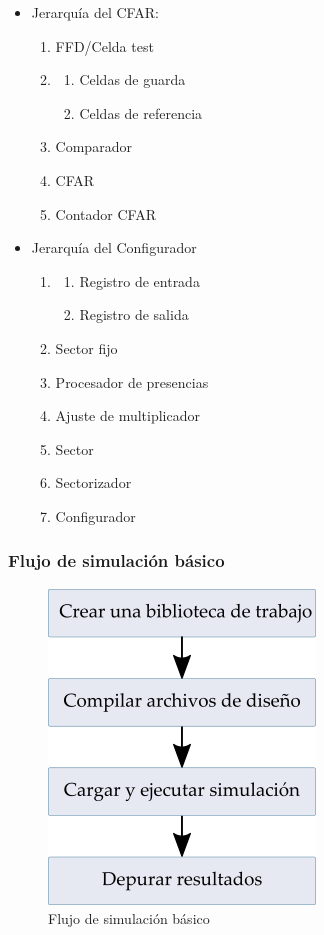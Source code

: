 \begin{itemize}
\item Jerarquía del CFAR:
	\begin{enumerate}
	\item FFD/Celda test
	\item
		\begin{enumerate}
		\item Celdas de guarda
		\item Celdas de referencia
		\end{enumerate}
	\item Comparador
	\item CFAR
	\item Contador CFAR
	\end{enumerate}
 
\item Jerarquía del Configurador
	\begin{enumerate}
	\item
		\begin{enumerate}
		\item Registro de entrada
		\item Registro de salida
		\end{enumerate}
	\item Sector fijo
	\item Procesador de presencias
	\item Ajuste de multiplicador
	\item Sector
	\item Sectorizador
	\item Configurador
	\end{enumerate}

\end{itemize}


\subsubsection{Flujo de simulación básico}


\begin{figure}
\centering
\includegraphics[scale=.7]{./Figures/flujo_simulacion.png}
\caption{Flujo de simulación básico}
\label{flujo_simulacion}
\end{figure}

